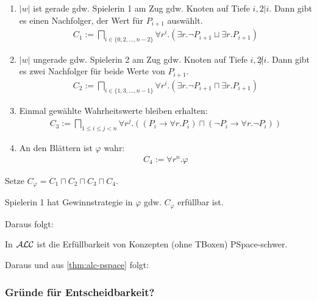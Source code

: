 \begin{enumerate}
    \item $|w|$ ist gerade gdw. Spielerin 1 am Zug gdw. Knoten auf Tiefe $i, 2|i$. Dann gibt es einen Nachfolger, der Wert für $P_{i + 1}$ auswählt.
        \begin{align*}
            C_1 := \bigsqcap_{i \in \{0, 2, \ldots, n - 2\}}
            \forall r^i.(\exists r.\neg P_{i + 1} \sqcup \exists r.P_{i + 1})
        \end{align*}
    \item $|w|$ ungerade gdw. Spielerin 2 am Zug gdw. Knoten auf Tiefe $i, 2 \not| i$. Dann gibt es zwei Nachfolger für beide Werte von $P_{i + 1}$.
        \begin{align*}
            C_2 := \bigsqcap_{i \in \{1, 3, \ldots, n - 1\}} 
            \forall r^i.(\exists r.\neg P_{i + 1} \sqcap \exists r.P_{i + 1})
        \end{align*}
    \item Einmal gewählte Wahrheitswerte bleiben erhalten:
        \begin{align*}
            C_3 := \bigsqcap_{1 \leq i \leq j < n} \forall r^j.\left( \left (
                    P_i \rightarrow \forall r.P_i
                    \right) \sqcap \left(
                    \neg P_i \rightarrow \forall r. \neg P_i
                \right)\right)
        \end{align*}
    \item An den Blättern ist $\varphi$ wahr:
        \begin{align*}
            C_4 := \forall r^n.\varphi
        \end{align*}
\end{enumerate}

Setze $C_\varphi = C_1 \sqcap C_2 \sqcap C_3 \sqcap C_4$.

\begin{lemma}
    Spielerin 1 hat Gewinnstrategie in $\varphi$ gdw. $C_\varphi$ erfüllbar ist.
\end{lemma}

Daraus folgt:

\begin{theorem}
    In $\mathcal{A}\mathcal{L}\mathcal{C}$ ist die Erfüllbarkeit von Konzepten (ohne TBoxen) PSpace-schwer.
\end{theorem}

Daraus und aus \autoref{thm:alc-pspace} folgt:

\subsubsection{Gründe für Entscheidbarkeit?}

